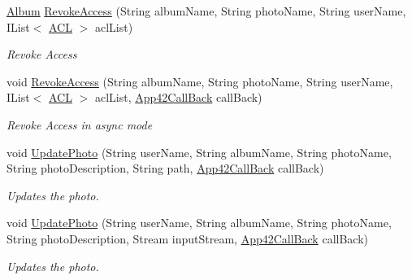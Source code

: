 \begin{DoxyCompactItemize}
\hyperlink{classcom_1_1shephertz_1_1app42_1_1paas_1_1sdk_1_1csharp_1_1gallery_1_1_album}{Album} \hyperlink{classcom_1_1shephertz_1_1app42_1_1paas_1_1sdk_1_1csharp_1_1gallery_1_1_photo_service_ac2fba480ea5f71f0fea6a432c60c7d9d}{Revoke\+Access} (String album\+Name, String photo\+Name, String user\+Name, I\+List$<$ \hyperlink{classcom_1_1shephertz_1_1app42_1_1paas_1_1sdk_1_1csharp_1_1_a_c_l}{A\+C\+L} $>$ acl\+List)
\begin{DoxyCompactList}\small\item\em Revoke Access \end{DoxyCompactList}\item 
void \hyperlink{classcom_1_1shephertz_1_1app42_1_1paas_1_1sdk_1_1csharp_1_1gallery_1_1_photo_service_adcd4da2af0d4d9aec8b0d795189f9a44}{Revoke\+Access} (String album\+Name, String photo\+Name, String user\+Name, I\+List$<$ \hyperlink{classcom_1_1shephertz_1_1app42_1_1paas_1_1sdk_1_1csharp_1_1_a_c_l}{A\+C\+L} $>$ acl\+List, \hyperlink{interfacecom_1_1shephertz_1_1app42_1_1paas_1_1sdk_1_1csharp_1_1_app42_call_back}{App42\+Call\+Back} call\+Back)
\begin{DoxyCompactList}\small\item\em Revoke Access in async mode \end{DoxyCompactList}\item 
void \hyperlink{classcom_1_1shephertz_1_1app42_1_1paas_1_1sdk_1_1csharp_1_1gallery_1_1_photo_service_a222967ef7a7effe4f1d0e7c105a7c5c3}{Update\+Photo} (String user\+Name, String album\+Name, String photo\+Name, String photo\+Description, String path, \hyperlink{interfacecom_1_1shephertz_1_1app42_1_1paas_1_1sdk_1_1csharp_1_1_app42_call_back}{App42\+Call\+Back} call\+Back)
\begin{DoxyCompactList}\small\item\em Updates the photo. \end{DoxyCompactList}\item 
void \hyperlink{classcom_1_1shephertz_1_1app42_1_1paas_1_1sdk_1_1csharp_1_1gallery_1_1_photo_service_a640ecd3d6f293a25c5a73ac1163b3cb6}{Update\+Photo} (String user\+Name, String album\+Name, String photo\+Name, String photo\+Description, Stream input\+Stream, \hyperlink{interfacecom_1_1shephertz_1_1app42_1_1paas_1_1sdk_1_1csharp_1_1_app42_call_back}{App42\+Call\+Back} call\+Back)
\begin{DoxyCompactList}\small\item\em Updates the photo. \end{DoxyCompactList}\end{DoxyCompactItemize}
